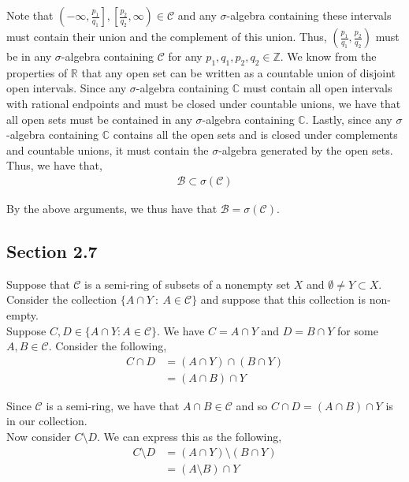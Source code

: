 \documentclass[12pt]{article}
\newenvironment{problem}[2][Problem]{\begin{trivlist}
\item[\hskip \labelsep {\bfseries #1}\hskip \labelsep {\bfseries #2.}]}{\end{trivlist}}
\begin{document}
Note that $\left(-\infty, \frac{p_1}{q_1}\right], \left[\frac{p_2}{q_2}, \infty\right) \in \mathcal{C}$ and any $\sigma$-algebra containing these intervals must contain their union and the complement of this union. Thus, $\left( \frac{p_1}{q_1}, \frac{p_2}{q_2} \right)$ must be in any $\sigma$-algebra containing $\mathcal{C}$ for any $p_1, q_1, p_2, q_2 \in \mathbb{Z}$. We know from the properties of $\mathbb{R}$ that any open set can be written as a countable union of disjoint open intervals. Since any $\sigma$-algebra containing $\mathbb{C}$ must contain all open intervals with rational endpoints and must be closed under countable unions, we have that all open sets must be contained in any $\sigma$-algebra containing $\mathbb{C}$. Lastly, since any $\sigma$-algebra containing $\mathbb{C}$ contains all the open sets and is closed under complements and countable unions, it must contain the $\sigma$-algebra generated by the open sets. Thus, we have that,
\begin{align*}
\mathcal{B} \subset \sigma(\mathcal{C})
\end{align*}

By the above arguments, we thus have that $\mathcal{B} = \sigma(\mathcal{C})$.

\subsection{Section 2.7}

\begin{problem}{1}
\end{problem}

Suppose that $\mathcal{C}$ is a semi-ring of subsets of a nonempty set $X$ and $\emptyset \neq Y \subset X$. Consider the collection $\{A \cap Y \ : \ A \in \mathcal{C} \}$ and suppose that this collection is non-empty.\\

Suppose $C, D \in \{A \cap Y : A \in \mathcal{C} \}$. We have $C = A \cap Y$ and $D = B \cap Y$ for some $A, B \in \mathcal{C}$. Consider the following,
\begin{align*}
C \cap D &= (A \cap Y) \cap (B \cap Y)\\
&= (A \cap B) \cap Y
\end{align*}

Since $\mathcal{C}$ is a semi-ring, we have that $A \cap B \in \mathcal{C}$ and so $C \cap D = (A \cap B) \cap Y$ is in our collection.\\

Now consider $C \setminus D$. We can express this as the following,
\begin{align*}
C \setminus D &= (A \cap Y) \setminus (B \cap Y)\\
&= (A \setminus B) \cap Y
\end{align*}
\end{document}
